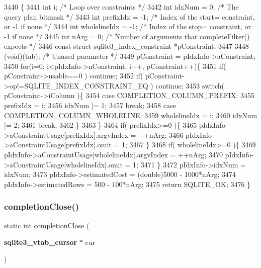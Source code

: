 \begin{DoxyCode}
3440  \{
3441   \textcolor{keywordtype}{int} i;                 \textcolor{comment}{/* Loop over constraints */}
3442   \textcolor{keywordtype}{int} idxNum = 0;        \textcolor{comment}{/* The query plan bitmask */}
3443   \textcolor{keywordtype}{int} prefixIdx = -1;    \textcolor{comment}{/* Index of the start= constraint, or -1 if none */}
3444   \textcolor{keywordtype}{int} wholelineIdx = -1; \textcolor{comment}{/* Index of the stop= constraint, or -1 if none */}
3445   \textcolor{keywordtype}{int} nArg = 0;          \textcolor{comment}{/* Number of arguments that completeFilter() expects */}
3446   \textcolor{keyword}{const} \textcolor{keyword}{struct }sqlite3\_index\_constraint *pConstraint;
3447 
3448   (void)(tab);    \textcolor{comment}{/* Unused parameter */}
3449   pConstraint = pIdxInfo->aConstraint;
3450   \textcolor{keywordflow}{for}(i=0; i<pIdxInfo->nConstraint; i++, pConstraint++)\{
3451     \textcolor{keywordflow}{if}( pConstraint->usable==0 ) \textcolor{keywordflow}{continue};
3452     \textcolor{keywordflow}{if}( pConstraint->op!=SQLITE_INDEX_CONSTRAINT_EQ ) \textcolor{keywordflow}{continue};
3453     \textcolor{keywordflow}{switch}( pConstraint->iColumn )\{
3454       \textcolor{keywordflow}{case} COMPLETION_COLUMN_PREFIX:
3455         prefixIdx = i;
3456         idxNum |= 1;
3457         \textcolor{keywordflow}{break};
3458       \textcolor{keywordflow}{case} COMPLETION_COLUMN_WHOLELINE:
3459         wholelineIdx = i;
3460         idxNum |= 2;
3461         \textcolor{keywordflow}{break};
3462     \}
3463   \}
3464   \textcolor{keywordflow}{if}( prefixIdx>=0 )\{
3465     pIdxInfo->aConstraintUsage[prefixIdx].argvIndex = ++nArg;
3466     pIdxInfo->aConstraintUsage[prefixIdx].omit = 1;
3467   \}
3468   \textcolor{keywordflow}{if}( wholelineIdx>=0 )\{
3469     pIdxInfo->aConstraintUsage[wholelineIdx].argvIndex = ++nArg;
3470     pIdxInfo->aConstraintUsage[wholelineIdx].omit = 1;
3471   \}
3472   pIdxInfo->idxNum = idxNum;
3473   pIdxInfo->estimatedCost = (double)5000 - 1000*nArg;
3474   pIdxInfo->estimatedRows = 500 - 100*nArg;
3475   \textcolor{keywordflow}{return} SQLITE_OK;
3476 \}
\end{DoxyCode}
\mbox{\label{shell_8c_a1d87b2f9f3fb19b59559c2353f657108}} 
\subsubsection{completion\+Close()}
{\footnotesize\ttfamily static int completion\+Close (\begin{DoxyParamCaption}\item[{\textbf{ sqlite3\+\_\+vtab\+\_\+cursor} $\ast$}]{cur }\end{DoxyParamCaption})\hspace{0.3cm}{\ttfamily [static]}}



